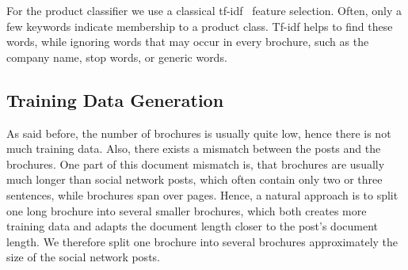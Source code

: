 For the product classifier we use a classical tf-idf~\cite{sparck1972statistical} feature selection.
Often, only a few keywords indicate membership to a product class.
Tf-idf helps to find these words, while ignoring words that may occur in every brochure, such as the company name, stop words, or generic words.


\subsection{Training Data Generation}

As said before, the number of brochures is usually quite low, hence there is not much training data.
Also, there exists a mismatch between the posts and the brochures.
One part of this document mismatch is, that brochures are usually much longer than social network posts, which often contain only two or three sentences, while brochures span over pages.
Hence, a natural approach is to split one long brochure into several smaller brochures, which both creates more training data and adapts the document length closer to the post's document length.
We therefore split one brochure into several brochures approximately the size of the social network posts.

